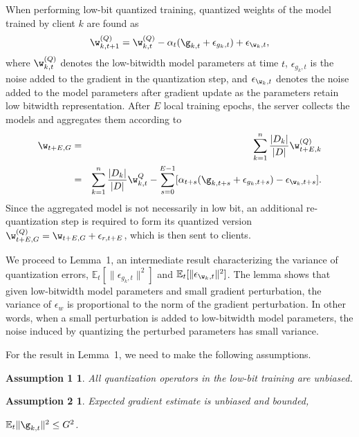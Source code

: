 \documentclass[a4paper,11pt]{article}
\begin{document}
When performing low-bit quantized training, quantized weights of the model trained by client $k$ are found as 
\begin{align*}
    \w_{k, t+1}^{(Q)} = \w_{k, t}^{(Q)} - \alpha_t (\g_{k, t} + \epsilon_{g_k, t} )+ \epsilon_{\w_k, t},
\end{align*}
where $\w_{k, t}^{(Q)}$ denotes the low-bitwidth model parameters at time $t$, $\epsilon_{g_k, t} $ is the noise added to the gradient in the quantization step, and $\epsilon_{\w_k, t}$ denotes the noise added to the model parameters after gradient update as the parameters retain low bitwidth representation. After $E$ local training epochs, the server collects the models and aggregates them according to 
\begin{eqnarray*}
    \w_{t+E, G} & = &\sum_{k=1}^n \frac{|D_k|}{|D|} \w_{t+E, k}^{(Q)} \\ & = & \sum_{k=1}^n \frac{|D_k|}{|D|} \w_{k, t}^{{Q}}
    - \sum_{s=0}^{E-1} [\alpha_{t+s}(\g_{k, t+s} + \epsilon_{g_k, t+s} ) - \epsilon_{\w_k, t+s}].
\end{eqnarray*}
Since the aggregated model is not necessarily in low bit, an additional re-quantization step is required to form its quantized version $\w_{t+E, G}^{(Q)} = \w_{t+E, G} + \epsilon_{r, t+E}$, which is then sent to clients.

We proceed to Lemma~1, an intermediate result characterizing the variance of quantization errors, $\mathbb{E}_t[\|\epsilon_{g_k, t} \|^2]$ and $\mathbb{E}_t[ \|\epsilon_{\w_k, t}\|^2] $. The lemma shows that given low-bitwidth model parameters and small gradient perturbation, the variance of $\epsilon_w$ is proportional to the norm of the gradient perturbation. In other words, when a small perturbation is added to low-bitwidth model parameters, the noise induced by quantizing the perturbed parameters has small variance.

For the result in Lemma~1, we need to make the following assumptions.

\newtheorem*{assumption1}{Assumption 1}
\begin{assumption1}
    All quantization operators in the low-bit training are unbiased.
\end{assumption1}
\newtheorem*{assumption2}{Assumption 2}
\begin{assumption2}
    Expected gradient estimate is unbiased and bounded, 
    
    $\mathbb{E}_t \|\g_{k, t} \|^2 \leq G^2$.
\end{assumption2}
\end{document}
